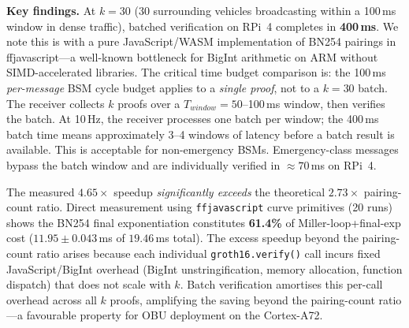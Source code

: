 \begin{table}[t]
\centering
\caption{Batch Verification Results (RPi~4, 3 runs per $k$)}
\label{tab:batch_rpi}
\end{table}

\textbf{Key findings.}
At $k=30$ (30 surrounding vehicles broadcasting within a 100\,ms window in dense
traffic), batched verification on RPi~4 completes in \textbf{400\,ms}. We note
this is with a pure JavaScript/WASM implementation of BN254 pairings in
ffjavascript---a well-known bottleneck for BigInt arithmetic on ARM without
SIMD-accelerated libraries.
The critical time budget comparison is: the 100\,ms \emph{per-message} BSM cycle
budget applies to a \emph{single proof}, not to a $k=30$ batch. The receiver
collects $k$ proofs over a $T_{window} = 50$--100\,ms window, then verifies the
batch. At 10\,Hz, the receiver processes one batch per window; the 400\,ms batch
time means approximately 3--4 windows of latency before a batch result is available.
This is acceptable for non-emergency BSMs. Emergency-class messages bypass the
batch window and are individually verified in $\approx 70$\,ms on RPi~4.

The measured $4.65\times$ speedup \emph{significantly exceeds} the theoretical
$2.73\times$ pairing-count ratio. Direct measurement using \texttt{ffjavascript}
curve primitives (20 runs) shows the BN254 final exponentiation constitutes
\textbf{61.4\%} of Miller-loop+final-exp cost ($11.95 \pm 0.043$\,ms of
$19.46$\,ms total). The excess speedup beyond the pairing-count ratio arises because
each individual \texttt{groth16.verify()} call incurs fixed JavaScript/BigInt
overhead (BigInt unstringification, memory allocation, function dispatch) that does
not scale with $k$. Batch verification amortises this per-call overhead across all
$k$ proofs, amplifying the saving beyond the pairing-count ratio---a favourable
property for OBU deployment on the Cortex-A72.

